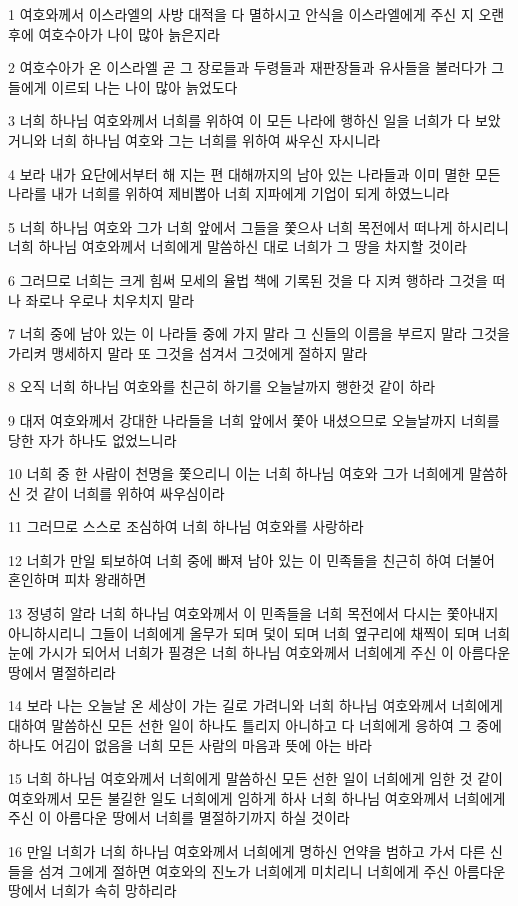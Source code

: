 \par 1 여호와께서 이스라엘의 사방 대적을 다 멸하시고 안식을 이스라엘에게 주신 지 오랜 후에 여호수아가 나이 많아 늙은지라
\par 2 여호수아가 온 이스라엘 곧 그 장로들과 두령들과 재판장들과 유사들을 불러다가 그들에게 이르되 나는 나이 많아 늙었도다
\par 3 너희 하나님 여호와께서 너희를 위하여 이 모든 나라에 행하신 일을 너희가 다 보았거니와 너희 하나님 여호와 그는 너희를 위하여 싸우신 자시니라
\par 4 보라 내가 요단에서부터 해 지는 편 대해까지의 남아 있는 나라들과 이미 멸한 모든 나라를 내가 너희를 위하여 제비뽑아 너희 지파에게 기업이 되게 하였느니라
\par 5 너희 하나님 여호와 그가 너희 앞에서 그들을 쫓으사 너희 목전에서 떠나게 하시리니 너희 하나님 여호와께서 너희에게 말씀하신 대로 너희가 그 땅을 차지할 것이라
\par 6 그러므로 너희는 크게 힘써 모세의 율법 책에 기록된 것을 다 지켜 행하라 그것을 떠나 좌로나 우로나 치우치지 말라
\par 7 너희 중에 남아 있는 이 나라들 중에 가지 말라 그 신들의 이름을 부르지 말라 그것을 가리켜 맹세하지 말라 또 그것을 섬겨서 그것에게 절하지 말라
\par 8 오직 너희 하나님 여호와를 친근히 하기를 오늘날까지 행한것 같이 하라
\par 9 대저 여호와께서 강대한 나라들을 너희 앞에서 쫓아 내셨으므로 오늘날까지 너희를 당한 자가 하나도 없었느니라
\par 10 너희 중 한 사람이 천명을 쫓으리니 이는 너희 하나님 여호와 그가 너희에게 말씀하신 것 같이 너희를 위하여 싸우심이라
\par 11 그러므로 스스로 조심하여 너희 하나님 여호와를 사랑하라
\par 12 너희가 만일 퇴보하여 너희 중에 빠져 남아 있는 이 민족들을 친근히 하여 더불어 혼인하며 피차 왕래하면
\par 13 정녕히 알라 너희 하나님 여호와께서 이 민족들을 너희 목전에서 다시는 쫓아내지 아니하시리니 그들이 너희에게 올무가 되며 덫이 되며 너희 옆구리에 채찍이 되며 너희 눈에 가시가 되어서 너희가 필경은 너희 하나님 여호와께서 너희에게 주신 이 아름다운 땅에서 멸절하리라
\par 14 보라 나는 오늘날 온 세상이 가는 길로 가려니와 너희 하나님 여호와께서 너희에게 대하여 말씀하신 모든 선한 일이 하나도 틀리지 아니하고 다 너희에게 응하여 그 중에 하나도 어김이 없음을 너희 모든 사람의 마음과 뜻에 아는 바라
\par 15 너희 하나님 여호와께서 너희에게 말씀하신 모든 선한 일이 너희에게 임한 것 같이 여호와께서 모든 불길한 일도 너희에게 임하게 하사 너희 하나님 여호와께서 너희에게 주신 이 아름다운 땅에서 너희를 멸절하기까지 하실 것이라
\par 16 만일 너희가 너희 하나님 여호와께서 너희에게 명하신 언약을 범하고 가서 다른 신들을 섬겨 그에게 절하면 여호와의 진노가 너희에게 미치리니 너희에게 주신 아름다운 땅에서 너희가 속히 망하리라


